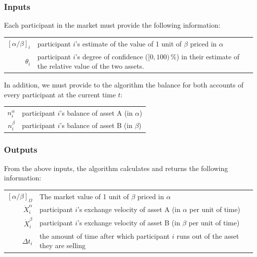 \documentclass[letterpaper]{article}
\begin{document}
\subsubsection{Inputs}
Each participant in the market must provide the following information:

\begin{tabularx}{\textwidth}{rX}
 $[\alpha/\beta]_i$ & participant $i$'s estimate of the value of 1 unit of $\beta$ priced in $\alpha$ \\
$\theta_i$ & participant $i$'s degree of confidence ($[0,100)\,\%$) in their estimate of the relative value of the two assets.
\end{tabularx}

In addition, we must provide to the algorithm the balance for both accounts of every participant at the current time $t$:

\begin{tabularx}{\textwidth}{rX}
 $n_i^\alpha$ & participant $i$'s balance of asset A (in $\alpha$) \\
$n_i^\beta$ & participant $i$'s balance of asset B (in $\beta$)
\end{tabularx}

\subsubsection{Outputs}
From the above inputs, the algorithm calculates and returns the following information:

\begin{tabularx}{\textwidth}{rX}
 $[\alpha/\beta]_\Omega$ & The market value of 1 unit of $\beta$ priced in $\alpha$ \\
$\dot{X}^\alpha_i$ & participant $i$'s exchange velocity of asset A (in $\alpha$ per unit of time)\\
$\dot{X}^\beta_i$ & participant $i$'s exchange velocity of asset B (in $\beta$ per unit of time) \\
$\Delta t_i$ & the amount of time after which participant $i$ runs out of the asset they are selling
\end{tabularx}
\end{document}
